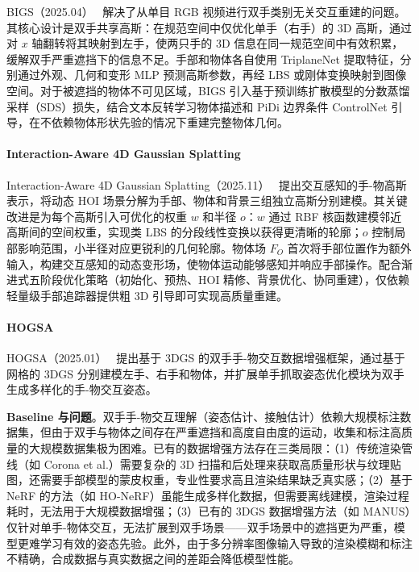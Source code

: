 BIGS（2025.04）~\cite{2504_09097} 解决了从单目 RGB 视频进行双手类别无关交互重建的问题。其核心设计是双手共享高斯：在规范空间中仅优化单手（右手）的 3D 高斯，通过对 $x$ 轴翻转将其映射到左手，使两只手的 3D 信息在同一规范空间中有效积累，缓解双手严重遮挡下的信息不足。手部和物体各自使用 TriplaneNet 提取特征，分别通过外观、几何和变形 MLP 预测高斯参数，再经 LBS 或刚体变换映射到图像空间。对于被遮挡的物体不可见区域，BIGS 引入基于预训练扩散模型的分数蒸馏采样（SDS）损失，结合文本反转学习物体描述和 PiDi 边界条件 ControlNet 引导，在不依赖物体形状先验的情况下重建完整物体几何。

\paragraph{Interaction-Aware 4D Gaussian Splatting}

Interaction-Aware 4D Gaussian Splatting（2025.11）~\cite{2511_14540} 提出交互感知的手-物高斯表示，将动态 HOI 场景分解为手部、物体和背景三组独立高斯分别建模。其关键改进是为每个高斯引入可优化的权重 $w$ 和半径 $o$：$w$ 通过 RBF 核函数建模邻近高斯间的空间权重，实现类 LBS 的分段线性变换以获得更清晰的轮廓；$o$ 控制局部影响范围，小半径对应更锐利的几何轮廓。物体场 $F_O$ 首次将手部位置作为额外输入，构建交互感知的动态变形场，使物体运动能够感知并响应手部操作。配合渐进式五阶段优化策略（初始化、预热、HOI 精修、背景优化、协同重建），仅依赖轻量级手部追踪器提供粗 3D 引导即可实现高质量重建。

\paragraph{HOGSA}

HOGSA（2025.01）~\cite{2501_02845} 提出基于 3DGS 的双手手-物交互数据增强框架，通过基于网格的 3DGS 分别建模左手、右手和物体，并扩展单手抓取姿态优化模块为双手生成多样化的手-物交互姿态。

\textbf{Baseline 与问题}。双手手-物交互理解（姿态估计、接触估计）依赖大规模标注数据集，但由于双手与物体之间存在严重遮挡和高度自由度的运动，收集和标注高质量的大规模数据集极为困难。已有的数据增强方法存在三类局限：（1）传统渲染管线（如 Corona et al.）需要复杂的 3D 扫描和后处理来获取高质量形状与纹理贴图，还需要手部模型的蒙皮权重，专业性要求高且渲染结果缺乏真实感；（2）基于 NeRF 的方法（如 HO-NeRF）虽能生成多样化数据，但需要离线建模，渲染过程耗时，无法用于大规模数据增强；（3）已有的 3DGS 数据增强方法（如 MANUS）仅针对单手-物体交互，无法扩展到双手场景——双手场景中的遮挡更为严重，模型更难学习有效的姿态先验。此外，由于多分辨率图像输入导致的渲染模糊和标注不精确，合成数据与真实数据之间的差距会降低模型性能。

